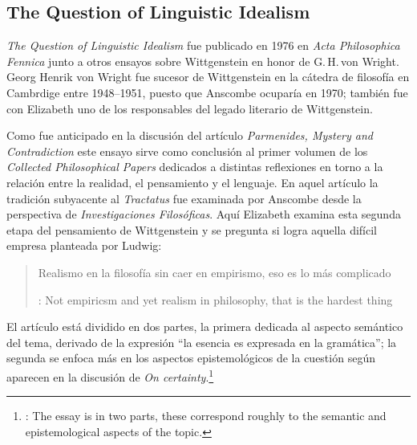\subsection{The Question of Linguistic Idealism}

\emph{The Question of Linguistic Idealism} fue publicado en 1976 en \emph{Acta Philosophica Fennica} junto a otros ensayos sobre Wittgenstein en honor de G.\,H.\,von Wright. Georg Henrik von Wright fue sucesor de Wittgenstein en la cátedra de filosofía en Cambrdige entre 1948--1951, puesto que Anscombe ocuparía en 1970; también fue con Elizabeth uno de los responsables del legado literario de Wittgenstein.

Como fue anticipado en la discusión del artículo \emph{Parmenides, Mystery and Contradiction} este ensayo sirve como conclusión al primer volumen de los \emph{Collected Philosophical Papers} dedicados a distintas reflexiones en torno a la relación entre la realidad, el pensamiento y el lenguaje. En aquel artículo la tradición subyacente al \emph{Tractatus} fue examinada por Anscombe desde la perspectiva de \emph{Investigaciones Filosóficas}. Aquí Elizabeth examina esta segunda etapa del pensamiento de Wittgenstein y se pregunta si logra aquella difícil empresa planteada por Ludwig: \blockquote[{\cite[112]{wittgenstein1956remmath}}: Not empiricsm and yet realism in philosophy, that is the hardest thing]{Realismo en la filosofía sin caer en empirismo, eso es lo más complicado}. El artículo está dividido en dos partes, la primera dedicada al aspecto semántico del tema, derivado de la expresión ``la esencia es expresada en la gramática''; la segunda se enfoca más en los aspectos epistemológicos de la cuestión según aparecen en la discusión de \emph{On certainty}.\footnote{\cite[Cf.~][215]{teichmann2008ans}: The essay is in two parts, these correspond roughly to the semantic and epistemological aspects of the topic.}

